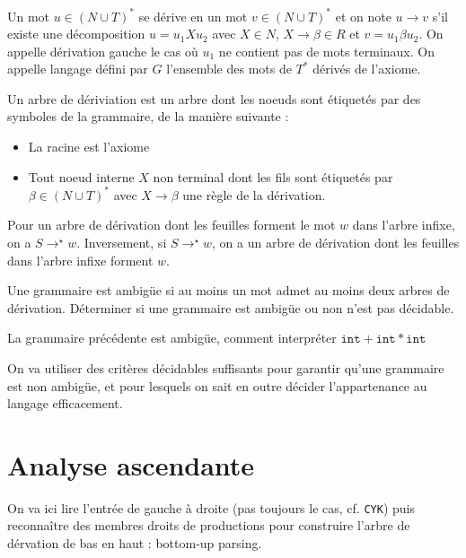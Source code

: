 \documentclass{cours}
\begin{document}
\begin{definition}
    Un mot $u \in (N\cup T)^{*}$ se dérive en un mot $v \in (N \cup T)^{*}$ et on note $u \rightarrow v$ s'il existe une décomposition $u = u_{1}Xu_{2}$ avec $X \in N$, $X \rightarrow \beta \in R$ et $v = u_{1}\beta u_{2}$. On appelle dérivation gauche le cas où $u_{1}$ ne contient pas de mots terminaux.
    On appelle langage défini par $G$ l'ensemble des mots de $T^{*}$ dérivés de l'axiome. 
\end{definition}

\begin{definition}
    Un arbre de dériviation est un arbre dont les noeuds sont étiquetés par des symboles de la grammaire, de la manière suivante : 
    \begin{itemize}
        \item La racine est l'axiome
        \item Tout noeud interne $X$ non terminal dont les fils sont étiquetés par $\beta \in (N\cup T)^{*}$ avec $X \rightarrow \beta$ une règle de la dérivation. 
    \end{itemize}
\end{definition}

Pour un arbre de dérivation dont les feuilles forment le mot $w$ dans l'arbre infixe, on a $S \rightarrow^{\star} w$. Inversement, si $S \rightarrow^{\star} w$, on a un arbre de dérivation dont les feuilles dans l'arbre infixe forment $w$. 

\begin{definition}
    Une grammaire est ambigüe si au moins un mot admet au moins deux arbres de dérivation. Déterminer si une grammaire est ambigüe ou non n'est pas décidable.
\end{definition}
La grammaire précédente est ambigüe, comment interpréter $\texttt{int} + \texttt{int} * \texttt{int}$

On va utiliser des critères décidables suffisants pour garantir qu'une grammaire est non ambigüe, et pour lesquels on sait en outre décider l'appartenance au langage efficacement.

\section{Analyse ascendante}
On va ici lire l'entrée de gauche à droite (pas toujours le cas, cf. \texttt{CYK}) puis reconnaître des membres droits de productions pour construire l'arbre de dérvation de bas en haut : bottom-up parsing.
\end{document}
